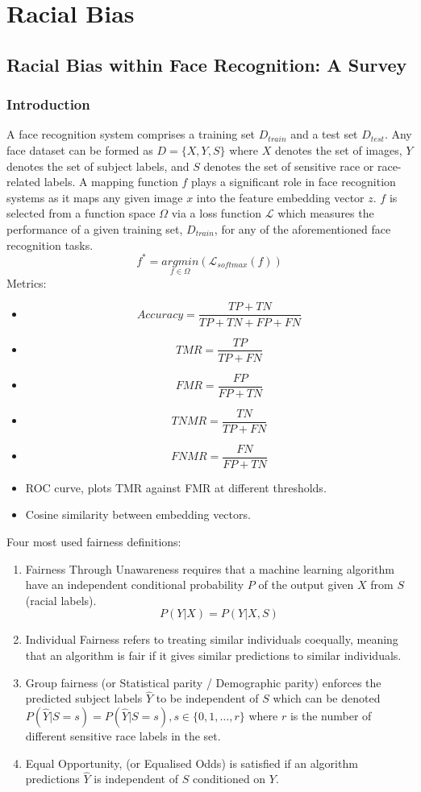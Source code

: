 \documentclass[12pt]{article}
\begin{document}
\section{Racial Bias}
\subsection{Racial Bias within Face Recognition: A Survey}
\subsubsection{Introduction}
A face recognition system comprises a training set $D_{train}$ and a test set $D_{test}$. Any face dataset can
be formed as $D = \{X,Y,S\}$ where $X$ denotes the set of images, $Y$ denotes the set of subject labels, and $S$ denotes the set of sensitive race or race-related labels. A mapping function $f$ plays a significant role in face recognition
systems as it maps any given image $x$ into the feature embedding vector $z$. $f$ is selected from a function space $\Omega$ via a
loss function $\mathcal{L}$ which measures the performance of a given training set, $D_{train}$, for any of the aforementioned face
recognition tasks. 
\[f^*=\underset{f\in\Omega}{argmin}(\mathcal{L}_{softmax}(f))\]
Metrics:
\begin{itemize}
  \item \[Accuracy = \dfrac{TP+TN}{TP+TN+FP+FN}\]
  \item \[TMR=\dfrac{TP}{TP+FN}\]
  \item \[FMR=\dfrac{FP}{FP+TN}\]
  \item \[TNMR=\dfrac{TN}{TP+FN}\]
  \item \[FNMR=\dfrac{FN}{FP+TN}\]
  \item ROC curve, plots TMR against FMR at different thresholds. 
  \item Cosine similarity between embedding vectors.
\end{itemize}
Four most used fairness definitions:
\begin{enumerate}
  \item Fairness Through Unawareness requires that a machine learning algorithm have an independent
  conditional probability $P$ of the output given $X$ from $S$ (racial labels).
  \[P(Y|X)=P(Y|X,S)\]
  \item Individual Fairness refers to treating similar individuals coequally, meaning that an algorithm is fair if
  it gives similar predictions to similar individuals.
  \item Group fairness (or Statistical parity / Demographic parity) enforces the predicted subject labels $\hat{Y}$
  to be independent of $S$ which can be denoted $P(\hat{Y}|S = s) = P(\hat{Y}|S = s), s \in \{0, 1, \ldots,r \}$ where $r$ is the number of different sensitive race labels in the set.
  \item Equal Opportunity, (or Equalised Odds) is satisfied if an algorithm predictions $\hat{Y}$ is independent of $S$
  conditioned on $Y$.
\end{enumerate}
\end{document}
